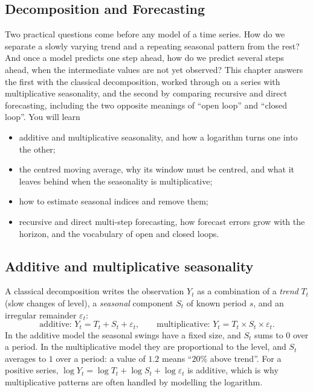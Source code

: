 \begin{notechapter}
\chapter{Decomposition and Forecasting}\label{ch:decomposition-forecasting}

\begin{chapterintro}
Two practical questions come before any model of a time series. How do we separate a
slowly varying trend and a repeating seasonal pattern from the rest? And once a model
predicts one step ahead, how do we predict several steps ahead, when the
intermediate values are not yet observed? This chapter answers the first with the
classical decomposition, worked through on a series with multiplicative
seasonality, and the second by comparing recursive and direct forecasting,
including the two opposite meanings of ``open loop'' and ``closed loop''. You will
learn
\begin{itemize}[nosep]
  \item additive and multiplicative seasonality, and how a logarithm turns one into the
        other;
  \item the centred moving average, why its window must be centred, and what it leaves
        behind when the seasonality is multiplicative;
  \item how to estimate seasonal indices and remove them;
  \item recursive and direct multi-step forecasting, how forecast errors grow with the
        horizon, and the vocabulary of open and closed loops.
\end{itemize}
\end{chapterintro}

\section{Additive and multiplicative seasonality}\label{decomposition-forecasting:sec:models}

A classical decomposition writes the observation $Y_t$ as a combination of a \emph{trend} $T_t$
(slow changes of level), a \emph{seasonal} component $S_t$ of known period $s$, and an irregular
remainder $\varepsilon_t$:
\[
  \text{additive: } Y_t = T_t + S_t + \varepsilon_t,\qquad
  \text{multiplicative: } Y_t = T_t\times S_t\times\varepsilon_t .
\]
In the additive model the seasonal swings have a fixed size, and $S_t$ sums to $0$ over a
period. In the multiplicative model they are proportional to the level, and $S_t$ averages
to $1$ over a period: a value of $1.2$ means ``$20\%$ above trend''. For a positive series,
$\log Y_t = \log T_t + \log S_t + \log\varepsilon_t$ is additive, which is why multiplicative patterns are often
handled by modelling the logarithm.


\end{notechapter}
